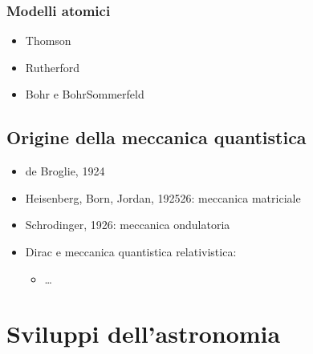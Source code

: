 \documentclass[letterpaper,10pt,italian]{jupyterBook}
\begin{document}
\subsection{Modelli atomici}
\label{\detokenize{ch/modern/quantum:modelli-atomici}}\label{\detokenize{ch/modern/quantum:physics-hs-modern-quantum-experience-atoms}}\begin{itemize}
\item {} 
\sphinxAtStartPar
Thomson

\item {} 
\sphinxAtStartPar
Rutherford

\item {} 
\sphinxAtStartPar
Bohr e Bohr\sphinxhyphen{}Sommerfeld

\end{itemize}


\section{Origine della meccanica quantistica}
\label{\detokenize{ch/modern/quantum:origine-della-meccanica-quantistica}}\begin{itemize}
\item {} 
\sphinxAtStartPar
de Broglie, 1924

\item {} 
\sphinxAtStartPar
Heisenberg, Born, Jordan, 1925\sphinxhyphen{}26: meccanica matriciale

\item {} 
\sphinxAtStartPar
Schrodinger, 1926: meccanica ondulatoria

\item {} 
\sphinxAtStartPar
Dirac e meccanica quantistica relativistica:
\begin{itemize}
\item {} 
\sphinxAtStartPar
…

\end{itemize}

\end{itemize}

\sphinxstepscope


\chapter{Sviluppi dell’astronomia}
\label{\detokenize{ch/modern/astronomy:sviluppi-dell-astronomia}}\label{\detokenize{ch/modern/astronomy:physics-hs-modern-astronomy}}\label{\detokenize{ch/modern/astronomy::doc}}
\sphinxAtStartPar
{}
\end{document}
